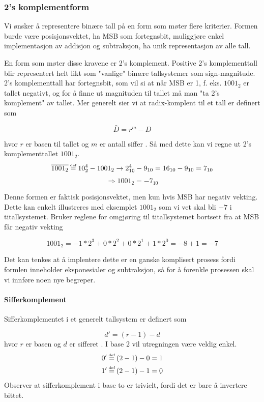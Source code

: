 \documentclass[11pt, a4paper, norwegian]{article}
\newcommand\defeq{\stackrel{\mathclap{\normalfont\mbox{\tiny def}}}{=}}
\begin{document}
\subsubsection{2's komplementform} \label{sec_2komp}
Vi ønsker å representere binære tall på en form som møter flere kriterier. Formen burde være posisjonsvektet, ha MSB som fortegnsbit, muliggjøre enkel implementasjon av addisjon og subtraksjon, ha unik representasjon av alle tall. 

En form som møter disse kravene er 2's komplement. Positive 2's komplementtall blir representert helt likt som "vanlige" binære tallsystemer som sign-magnitude. 2's komplementtall har fortegnsbit, som vil si at når MSB er 1, f. eks. $1001_2$ er tallet negativt, og for å finne ut magnituden til tallet må man "ta 2's komplement" av tallet. Mer generelt sier vi at radix-komplent til et tall er definert som

\begin{equation}
\bar{D} = r^m - D
\end{equation}

hvor $r$ er basen til tallet og $m$ er antall siffer \cite{digtekbok}. Så med dette kan vi regne ut 2's komplementtallet $1001_2$.
$$\overline{1001_2} \defeq 10_2^4 - 1001_2 \rightarrow 2_{10}^4 -9_{10} = 16_{10}-9_{10}= 7_{10} $$
$$\Rightarrow 1001_2 = -7_{10}$$

Denne formen er faktisk posisjonsvektet, men kun hvis MSB har negativ vekting. Dette kan enkelt illustreres med eksemplet $1001_2$ som vi vet skal bli $-7$ i titallsystemet. Bruker reglene for omgjøring til titallsystemet bortsett fra at MSB får negativ vekting

\begin{equation*}
1001_2 = -1*2^3 + 0*2^2 + 0*2^1 + 1*2^0 = -8 + 1 = -7
\end{equation*}

Det kan tenkes at å implentere dette er en ganske komplisert prosess fordi formlen inneholder eksponesialer og subtraksjon, så for å forenkle prosessen skal vi innføre noen nye begreper. 

\paragraph{Sifferkomplement}
Sifferkomplementet i et generelt tallsystem er definert som  

\begin{equation}
d' = (r-1) -d
\end{equation}
hvor $r$ er basen og $d$ er sifferet \cite{digtekbok}. I base 2 vil utregningen være veldig enkel.
\begin{align*}
0' \defeq (2-1) - 0 = 1 \\
1' \defeq (2-1) -1 = 0
\end{align*}
Observer at sifferkomplement i base to er trivielt, fordi det er bare å invertere bittet. 
\end{document}
